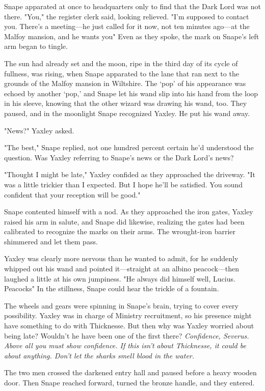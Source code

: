 Snape apparated at once to headquarters only to find that the Dark Lord was not there. "You," the register clerk said, looking relieved. "I'm supposed to contact you. There's a meeting—he just called for it now, not ten minutes ago—at the Malfoy mansion, and he wants you{\el}" Even as they spoke, the mark on Snape's left arm began to tingle.

The sun had already set and the moon, ripe in the third day of its cycle of fullness, was rising, when Snape apparated to the lane that ran next to the grounds of the Malfoy mansion in Wiltshire. The `pop' of his appearance was echoed by another `pop,' and Snape let his wand slip into his hand from the loop in his sleeve, knowing that the other wizard was drawing his wand, too. They paused, and in the moonlight Snape recognized Yaxley. He put his wand away.

"News?" Yaxley asked.

"The best," Snape replied, not one hundred percent certain he'd understood the question. Was Yaxley referring to Snape's news or the Dark Lord's news?

"Thought I might be late," Yaxley confided as they approached the driveway. "It was a little trickier than I expected. But I hope he'll be satisfied. You sound confident that your reception will be good."

Snape contented himself with a nod. As they approached the iron gates, Yaxley raised his arm in salute, and Snape did likewise, realizing the gates had been calibrated to recognize the marks on their arms. The wrought-iron barrier shimmered and let them pass.

Yaxley was clearly more nervous than he wanted to admit, for he suddenly whipped out his wand and pointed it—straight at an albino peacock—then laughed a little at his own jumpiness. "He always did himself well, Lucius. Peacocks{\el}" In the stillness, Snape could hear the trickle of a fountain.

The wheels and gears were spinning in Snape's brain, trying to cover every possibility. Yaxley was in charge of Ministry recruitment, so his presence might have something to do with Thicknesse. But then why was Yaxley worried about being late? Wouldn't he have been one of the first there? \emph{Confidence, Severus. Above all you must show confidence. If this isn't about Thicknesse, it could be about anything. Don't let the sharks smell blood in the water.}

The two men crossed the darkened entry hall and paused before a heavy wooden door. Then Snape reached forward, turned the bronze handle, and they entered.

